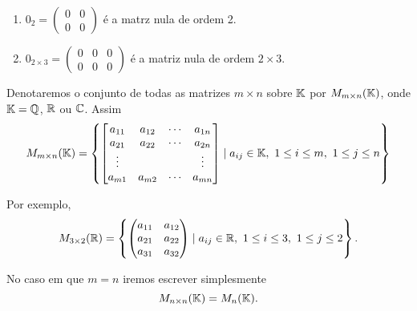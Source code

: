 \begin{exemplo}
    \begin{enumerate}
        \item $0_2 = \begin{pmatrix} 0 & 0\\0 & 0\end{pmatrix}$ é a matrz nula de ordem 2.

        \item $0_{2 \times 3} = \begin{pmatrix}0 & 0 & 0\\0 & 0 & 0\end{pmatrix}$ é a matriz nula de ordem $2 \times 3$.
    \end{enumerate}
\end{exemplo}

\begin{notacao}
	Denotaremos o conjunto de todas as matrizes $m \times n$ sobre $\mathbb{K}$ por $M_{m\times n}(\mathbb{K})$, onde $\mathbb{K} = \mathbb{Q}$, $\mathbb{R}$ ou $\mathbb{C}$. Assim
	\[
		M_{m \times n}(\mathbb{K}) = \left\{\begin{bmatrix}
			a_{11} & a_{12} & \cdots & a_{1n}\\
			a_{21} & a_{22} & \cdots & a_{2n}\\
			\vdots & & & \vdots\\
		a_{m1} & a_{m2} & \cdots & a_{mn}\end{bmatrix} \mid a_{ij} \in \mathbb{K},\ 1 \le i \le m,\ 1 \le j \le n
		\right\}
	\]
\end{notacao}

Por exemplo,
\[
	M_{3\times 2}(\mathbb{R}) = \left\{\begin{pmatrix}a_{11} & a_{12}\\a_{21} & a_{22}\\ a_{31} & a_{32}\end{pmatrix} \mid a_{ij} \in \mathbb{R},\ 1 \le i \le 3,\ 1 \le j \le 2\right\}.
\]


No caso em que $m = n$ iremos escrever simplesmente
\[
	M_{n\times n}(\mathbb{K}) = M_n(\mathbb{K}).
\]

